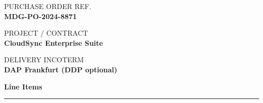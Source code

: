 \documentclass[11pt,a4paper]{article}
\newcommand{\labeltext}[1]{\textcolor{TextLight}{\footnotesize\MakeUppercase{#1}}}
\newcommand{\valuetext}[1]{\textcolor{TextDark}{\small\bfseries #1}}
\newcommand{\sectionrule}{%
  \noindent\textcolor{NexaTeal}{\rule{\linewidth}{1.5pt}}%
}
\begin{document}
\noindent
\begin{minipage}[t]{0.30\linewidth}
  \begin{tcolorbox}[infopanel]
    \labeltext{Purchase Order Ref.}\\[3pt]
    \valuetext{MDG-PO-2024-8871}
  \end{tcolorbox}
\end{minipage}%
\hfill
\begin{minipage}[t]{0.30\linewidth}
  \begin{tcolorbox}[infopanel]
    \labeltext{Project / Contract}\\[3pt]
    \valuetext{CloudSync Enterprise Suite}
  \end{tcolorbox}
\end{minipage}%
\hfill
\begin{minipage}[t]{0.30\linewidth}
  \begin{tcolorbox}[infopanel]
    \labeltext{Delivery Incoterm}\\[3pt]
    \valuetext{DAP Frankfurt (DDP optional)}
  \end{tcolorbox}
\end{minipage}

\par\vspace{8mm}

{\color{NexaNavy}\large\bfseries Line Items}
\par\vspace{2mm}
\sectionrule
\vspace{3mm}

\renewcommand{\arraystretch}{1.45}
\setlength{\tabcolsep}{6pt}
\end{document}

